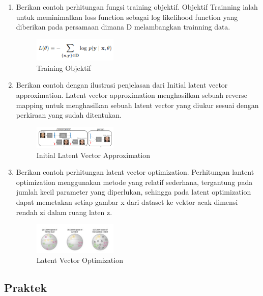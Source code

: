 \begin{enumerate}
        \item Berikan contoh perhitungan fungsi training objektif.
		Objektif Trainning ialah untuk meminimalkan loss function sebagai log likelihood function yang diberikan pada persamaan dimana D melambangkan trainning data.
		\begin{figure}[H]
			\includegraphics[width=4cm]{figures/1174035/chapter9/teori9.png}
            	\centering
           	 \caption{Training Objektif}
       	\end{figure}

        \item Berikan contoh dengan ilustrasi penjelasan dari Initial latent vector approximation.
		Latent vector approximation menghasilkan sebuah reverse mapping untuk menghasilkan sebuah latent vector yang diukur sesuai dengan perkiraan yang sudah ditentukan.
		\begin{figure}[H]
			\includegraphics[width=4cm]{figures/1174035/chapter9/teori10.png}
            	\centering
           	 \caption{Initial Latent Vector Approximation}
       	\end{figure}

        \item Berikan contoh perhitungan latent vector optimization.
		Perhitungan lantent optimization menggunakan metode yang relatif sederhana, tergantung pada jumlah kecil parameter yang diperlukan, sehingga pada latent optimization dapat memetakan setiap gambar x dari dataset ke vektor acak dimensi rendah zi dalam ruang laten z.
		\begin{figure}[H]
			\includegraphics[width=4cm]{figures/1174035/chapter9/teori11.png}
            	\centering
           	\caption{Latent Vector Optimization}
        \end{figure}
           
    \end{enumerate}

\subsection{Praktek}


